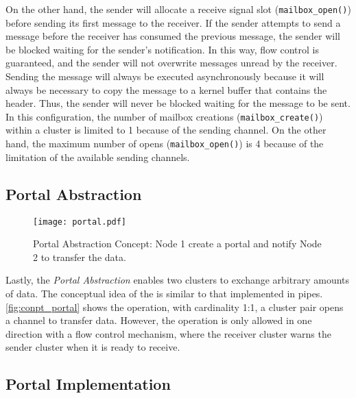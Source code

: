 				On the other hand, the sender will allocate a receive signal slot (\texttt{mailbox\_open()})
				before sending its first message to the receiver.
				If the sender attempts to send a message before the receiver has consumed
				the previous message, the sender will be blocked waiting for the sender's notification.
				In this way, flow control is guaranteed, and the sender will not overwrite
				messages unread by the receiver.
				Sending the message will always be executed asynchronously
				because it will always be necessary to copy the message to
				a kernel buffer that contains the header.
				Thus, the sender will never be blocked waiting for the message to be sent.
				In this configuration, the number of mailbox creations (\texttt{mailbox\_create()})
				within a cluster is limited to 1 because of the \cnoc sending channel.
				On the other hand, the maximum number of opens (\texttt{mailbox\_open()}) is
				4 because of the limitation of the available \dnoc sending channels.

		\subsection{Portal Abstraction}
		\label{sec.portal-abs}

			\begin{figure}[!tb]
				\centering%
				\caption{Portal Abstraction Concept: Node 1 create a portal and notify Node 2 to transfer the data.}%
				\label{fig:conpt_portal}%
				\texttt{[image: portal.pdf]}%
			\end{figure}


			Lastly, the \textit{Portal Abstraction} enables two clusters to exchange arbitrary
			amounts of data.
			The conceptual idea of the \portal is similar to that implemented in \posix pipes.
			\autoref{fig:conpt_portal} shows the \portal operation, with cardinality
			1:1, a cluster pair opens a channel to transfer data.
			However, the operation is only allowed in one direction with a flow control mechanism,
			where the receiver cluster warns the sender cluster when it is ready to receive.

			\subsection*{Portal Implementation}

